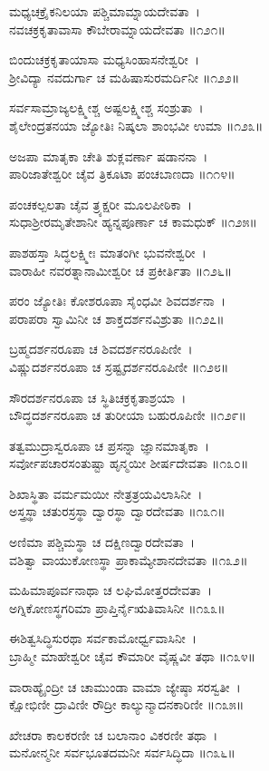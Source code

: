 ಮಧ್ಯಚಕ್ರೈಕನಿಲಯಾ ಪಶ್ಚಿಮಾಮ್ನಾಯದೇವತಾ~।\\
ನವಚಕ್ರಕೃತಾವಾಸಾ ಕೌಬೇರಾಮ್ನಾಯದೇವತಾ ॥೧೨೧॥

	ಬಿಂದುಚಕ್ರಕೃತಾಯಾಸಾ ಮಧ್ಯಸಿಂಹಾಸನೇಶ್ವರೀ~।\\
	ಶ್ರೀವಿದ್ಯಾ ನವದುರ್ಗಾ ಚ ಮಹಿಷಾಸುರಮರ್ದಿನೀ ॥೧೨೨॥

ಸರ್ವಸಾಮ್ರಾಜ್ಯಲಕ್ಷ್ಮೀಶ್ಚ ಅಷ್ಟಲಕ್ಷ್ಮೀಶ್ಚ ಸಂಶ್ರುತಾ~।\\
ಶೈಲೇಂದ್ರತನಯಾ ಜ್ಯೋತಿಃ ನಿಷ್ಕಲಾ ಶಾಂಭವೀ ಉಮಾ ॥೧೨೩॥

	ಅಜಪಾ ಮಾತೃಕಾ ಚೇತಿ ಶುಕ್ಲವರ್ಣಾ ಷಡಾನನಾ~।\\
	ಪಾರಿಜಾತೇಶ್ವರೀ ಚೈವ ತ್ರಿಕೂಟಾ ಪಂಚಬಾಣದಾ ॥೧೧೪॥

ಪಂಚಕಲ್ಪಲತಾ ಚೈವ ತ್ರ್ಯಕ್ಷರೀ ಮೂಲಪೀಠಿಕಾ~।\\
ಸುಧಾಶ್ರೀರಮೃತೇಶಾನೀ ಹ್ಯನ್ನಪೂರ್ಣಾ ಚ ಕಾಮಧುಕ್ ॥೧೨೫॥

	ಪಾಶಹಸ್ತಾ ಸಿದ್ಧಲಕ್ಷ್ಮೀಃ ಮಾತಂಗೀ ಭುವನೇಶ್ವರೀ~।\\
	ವಾರಾಹೀ ನವರತ್ನಾನಾಮೀಶ್ವರೀ ಚ ಪ್ರಕೀರ್ತಿತಾ ॥೧೨೬॥

ಪರಂ ಜ್ಯೋತಿಃ ಕೋಶರೂಪಾ ಸೈಂಧವೀ ಶಿವದರ್ಶನಾ~।\\
ಪರಾಪರಾ ಸ್ವಾಮಿನೀ ಚ ಶಾಕ್ತದರ್ಶನವಿಶ್ರುತಾ ॥೧೨೭॥

	ಬ್ರಹ್ಮದರ್ಶನರೂಪಾ ಚ ಶಿವದರ್ಶನರೂಪಿಣೀ~।\\
	ವಿಷ್ಣುದರ್ಶನರೂಪಾ ಚ ಸ್ರಷ್ಟೃದರ್ಶನರೂಪಿಣೀ ॥೧೨೮॥

ಸೌರದರ್ಶನರೂಪಾ ಚ ಸ್ಥಿತಿಚಕ್ರಕೃತಾಶ್ರಯಾ~।\\
ಬೌದ್ಧದರ್ಶನರೂಪಾ ಚ ತುರೀಯಾ ಬಹುರೂಪಿಣೀ ॥೧೨೯॥

	ತತ್ವಮುದ್ರಾಸ್ವರೂಪಾ ಚ ಪ್ರಸನ್ನಾ ಜ್ಞಾನಮಾತೃಕಾ~।\\
	ಸರ್ವೋಪಚಾರಸಂತುಷ್ಟಾ ಹೃನ್ಮಯೀ ಶೀರ್ಷದೇವತಾ ॥೧೩೦॥

ಶಿಖಾಸ್ಥಿತಾ ವರ್ಮಮಯೀ ನೇತ್ರತ್ರಯವಿಲಾಸಿನೀ~।\\
ಅಸ್ತ್ರಸ್ಥಾ ಚತುರಸ್ರಸ್ಥಾ ದ್ವಾರಸ್ಥಾ ದ್ವಾರದೇವತಾ ॥೧೩೧॥

	ಅಣಿಮಾ ಪಶ್ಚಿಮಸ್ಥಾ ಚ ದಕ್ಷಿಣದ್ವಾರದೇವತಾ~।\\
	ವಶಿತ್ವಾ ವಾಯುಕೋಣಸ್ಥಾ ಪ್ರಾಕಾಮ್ಯೇಶಾನದೇವತಾ ॥೧೩೨॥

ಮಹಿಮಾಪೂರ್ವನಾಥಾ ಚ ಲಘಿಮೋತ್ತರದೇವತಾ~।\\
ಅಗ್ನಿಕೋಣಸ್ಥಗರಿಮಾ ಪ್ರಾಪ್ತಿರ್ನೈಋತಿವಾಸಿನೀ ॥೧೩೩॥

	ಈಶಿತ್ವಸಿದ್ಧಿಸುರಥಾ ಸರ್ವಕಾಮೋರ್ಧ್ವವಾಸಿನೀ~।\\
	ಬ್ರಾಹ್ಮೀ ಮಾಹೇಶ್ವರೀ ಚೈವ ಕೌಮಾರೀ ವೈಷ್ಣವೀ ತಥಾ ॥೧೩೪॥

ವಾರಾಹ್ಯೈಂದ್ರೀ ಚ ಚಾಮುಂಡಾ ವಾಮಾ ಜ್ಯೇಷ್ಠಾ ಸರಸ್ವತೀ~।\\
ಕ್ಷೋಭಿಣೀ ದ್ರಾವಿಣೀ ರೌದ್ರೀ ಕಾಲ್ಯುನ್ಮಾದನಕಾರಿಣೀ ॥೧೩೫॥

	ಖೇಚರಾ ಕಾಲಕರಣೀ ಚ ಬಲಾನಾಂ ವಿಕರಣೀ ತಥಾ~।\\
	ಮನೋನ್ಮನೀ ಸರ್ವಭೂತದಮನೀ ಸರ್ವಸಿದ್ಧಿದಾ ॥೧೩೬॥

